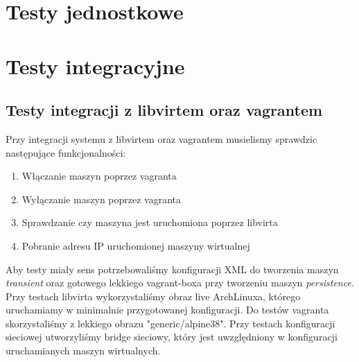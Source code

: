 \documentclass[12pt]{article}
\begin{document}

\tableofcontents

\newpage

\section{Testy jednostkowe}

\section{Testy integracyjne}

\subsection {Testy integracji z libvirtem oraz vagrantem}

Przy integracji systemu z libvirtem oraz vagrantem musielismy sprawdzic następujące funkcjonalności:
\begin{enumerate}
	\item Włączanie maszyn poprzez vagranta
	\item Wyłączanie maszyn poprzez vagranta
	\item Sprawdzanie czy maszyna jest uruchomiona poprzez libvirta
	\item Pobranie adresu IP uruchomionej maszyny wirtualnej
\end{enumerate}

Aby testy miały sens potrzebowaliśmy konfiguracji XML do tworzenia maszyn \textit{transient} oraz gotowego lekkiego vagrant-boxa przy tworzeniu maszyn \textit{persistence}.
Przy testach libvirta wykorzystaliśmy obraz live ArchLinuxa, którego uruchamiamy w minimalnie przygotowanej konfiguracji.
Do testów vagranta skorzystaliśmy z lekkiego obrazu "generic/alpine38".
Przy testach konfiguracji sieciowej utworzyliśmy bridge sieciowy, który jest uwzględniony w konfiguracji uruchamianych maszyn wirtualnych.
\end{document}
